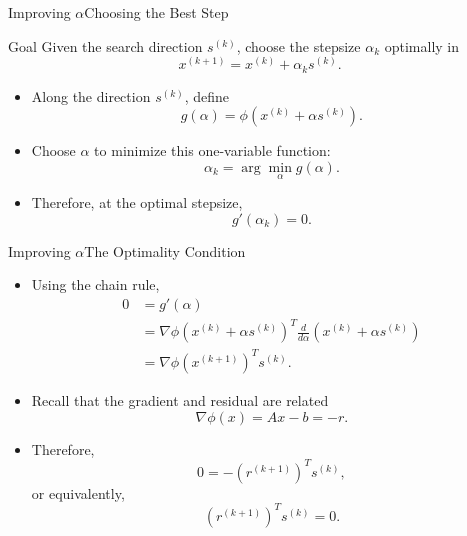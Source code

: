 \documentclass[10pt]{beamer}
\begin{document}
\begin{frame}{Improving $\alpha$}{Choosing the Best Step}

\begin{block}{Goal}
Given the search direction $s^{(k)}$, choose the stepsize $\alpha_k$
optimally in
\[
x^{(k+1)} = x^{(k)} + \alpha_k s^{(k)}.
\]
\end{block}

\begin{itemize}

\item[1.] Along the direction $s^{(k)}$, define
\[
g(\alpha)
=
\phi\!\left(x^{(k)}+\alpha s^{(k)}\right).
\]

\item[2.] Choose $\alpha$ to minimize this one-variable function:
\[
\alpha_k = \arg\min_{\alpha} g(\alpha).
\]

\item[3.] Therefore, at the optimal stepsize,
\[
g'(\alpha_k)=0.
\]

\end{itemize}
\end{frame}
\begin{frame}{Improving $\alpha$}{The Optimality Condition}
\begin{itemize}
    \item[4.] Using the chain rule,
\begin{align*}
0
&= g'(\alpha) \\[1mm]
&=
\nabla\phi\!\left(x^{(k)}+\alpha s^{(k)}\right)^T
\frac{d}{d\alpha}
\left(x^{(k)}+\alpha s^{(k)}\right) \\[1mm]
&=
\nabla\phi(x^{(k+1)})^T s^{(k)}.
\end{align*}

\item[5.] Recall that the gradient and residual are related
\[
\nabla\phi(x)=Ax-b=-r.
\]

\item[6.] Therefore,
\[
0=-(r^{(k+1)})^T s^{(k)},
\]
or equivalently,
\[
\boxed{(r^{(k+1)})^T s^{(k)}=0.}
\]
\end{itemize}


\end{frame}
\end{document}

